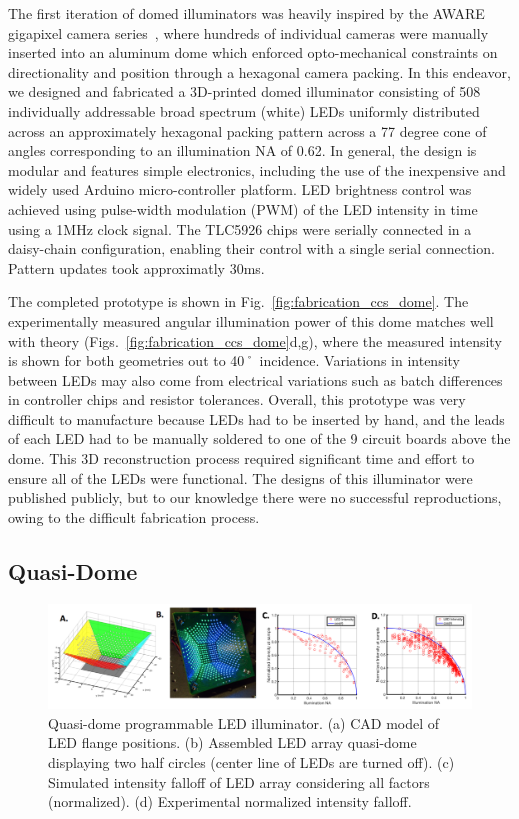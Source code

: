 The first iteration of domed illuminators was heavily inspired by the AWARE gigapixel camera series~\cite{brady2012multiscale, marks2014characterization, llull2015characterization}, where hundreds of individual cameras were manually inserted into an aluminum dome which enforced opto-mechanical constraints on directionality and position through a hexagonal camera packing. In this endeavor, we designed and fabricated a 3D-printed domed illuminator consisting of 508 individually addressable broad spectrum (white) LEDs uniformly distributed across an approximately hexagonal packing pattern across a 77 degree cone of angles corresponding to an illumination NA of 0.62. In general, the design is modular and features simple electronics, including the use of the inexpensive and widely used Arduino micro-controller platform. LED brightness control was achieved using pulse-width modulation (PWM) of the LED intensity in time using a 1MHz clock signal. The TLC5926 chips were serially connected in a daisy-chain configuration, enabling their control with a single serial connection. Pattern updates took approximatly 30ms.

The completed prototype is shown in Fig.~\ref{fig:fabrication_ccs_dome}. The experimentally measured angular illumination power of this dome matches well with theory (Figs.~\ref{fig:fabrication_ccs_dome}d,g), where the measured intensity is shown for both geometries out to 40˚ incidence. Variations in intensity between LEDs may also come from electrical variations such as batch differences in controller chips and resistor tolerances. Overall, this prototype was very difficult to manufacture because LEDs had to be inserted by hand, and the leads of each LED had to be manually soldered to one of the 9 circuit boards above the dome. This 3D reconstruction process required significant time and effort to ensure all of the LEDs were functional. The designs of this illuminator were published publicly, but to our knowledge there were no successful reproductions, owing to the difficult fabrication process.

\subsection{Quasi-Dome}\label{sec:fabrication:quasidome} 

\begin{figure}
    \centering
    \includegraphics[width=\textwidth]{figures/fig_qdome_main.png}
    \caption{Quasi-dome programmable LED illuminator. (a) CAD model of LED flange positions. (b) Assembled LED array quasi-dome displaying two half circles (center line of LEDs are turned off). (c) Simulated intensity falloff of LED array considering all factors (normalized). (d) Experimental normalized intensity falloff.}\label{fig:fig_fabrication_quasi_dome}
\end{figure}

